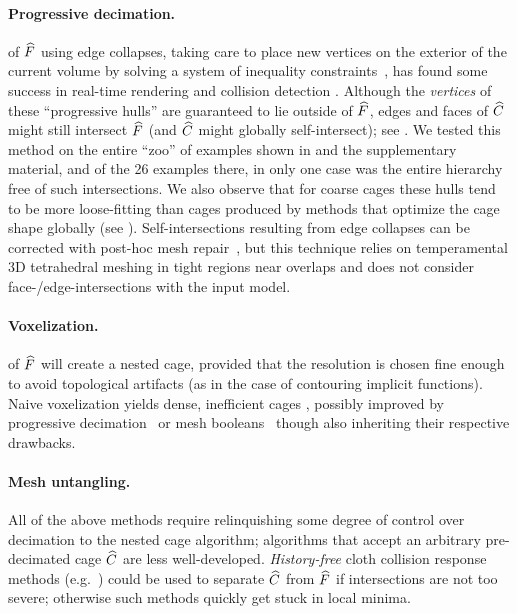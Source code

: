 \paragraph{Progressive decimation.} of $\widehat{F}$ using edge collapses, taking care
to place new vertices on the exterior of the current volume by solving a system
of inequality constraints~\cite{Sander:2000:SC}, has found some success in
real-time rendering and collision detection \cite{Platis:CGF}.  Although
the \emph{vertices} of these ``progressive hulls'' are guaranteed to lie
outside of $\widehat{F}$, edges and faces of $\widehat{C}$ might still
intersect $\widehat{F}$ (and $\widehat{C}$ might globally self-intersect); see
. We tested this method on the entire ``zoo'' of
examples shown in  and the supplementary material, and of the 26
examples there, in only one case was the entire hierarchy free of such
intersections. We also observe that for coarse cages these hulls tend to be
more loose-fitting than cages produced by methods that optimize the cage shape
globally (see ).  Self-intersections resulting from
edge collapses can be corrected with post-hoc mesh repair~\cite{Deng:2011vr},
but this technique relies on temperamental 3D tetrahedral meshing in tight
regions near overlaps and does not consider face-/edge-intersections with
the input model.

\paragraph{Voxelization.} of $\widehat{F}$ will create a nested cage, provided that
the resolution is chosen fine enough to avoid topological
artifacts (as in the case of contouring implicit functions). Naive voxelization
yields dense, inefficient cages \cite{Mehra:2009:AMS}, possibly improved by
progressive decimation~\cite{Xian:2009} or mesh booleans~\cite{Xian:2015}
though also inheriting their respective drawbacks.

\paragraph{Mesh untangling.}
%
All of the above methods require relinquishing some degree of control over
decimation to the nested cage algorithm; algorithms that accept an arbitrary
pre-decimated cage $\widehat{C}$ are less well-developed. \emph{History-free} cloth
collision response methods (e.g.\
\cite{Baraff:2003:UC,Volino:2006:RSC,Wicke:2006,Ye:2012:ICM}) could be used to
separate $\widehat{C}$ from $\widehat{F}$ if intersections are not too severe; otherwise
such methods quickly get stuck in local minima.

